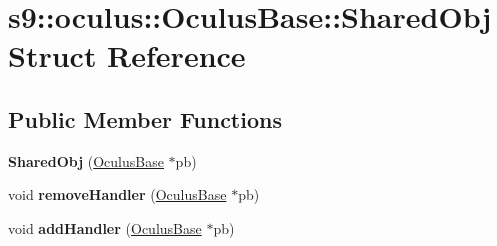 \hypertarget{structs9_1_1oculus_1_1OculusBase_1_1SharedObj}{\section{s9\-:\-:oculus\-:\-:\-Oculus\-Base\-:\-:\-Shared\-Obj \-Struct \-Reference}
\label{structs9_1_1oculus_1_1OculusBase_1_1SharedObj}
}
\subsection*{\-Public \-Member \-Functions}
\begin{DoxyCompactItemize}
\item 
\hypertarget{structs9_1_1oculus_1_1OculusBase_1_1SharedObj_a418315a53d540e4d108e287c7aeee968}{{\bfseries \-Shared\-Obj} (\hyperlink{classs9_1_1oculus_1_1OculusBase}{\-Oculus\-Base} $\ast$pb)}\label{structs9_1_1oculus_1_1OculusBase_1_1SharedObj_a418315a53d540e4d108e287c7aeee968}

\item 
\hypertarget{structs9_1_1oculus_1_1OculusBase_1_1SharedObj_a78657ecab21e06631fa1ede8ae62d153}{void {\bfseries remove\-Handler} (\hyperlink{classs9_1_1oculus_1_1OculusBase}{\-Oculus\-Base} $\ast$pb)}\label{structs9_1_1oculus_1_1OculusBase_1_1SharedObj_a78657ecab21e06631fa1ede8ae62d153}

\item 
\hypertarget{structs9_1_1oculus_1_1OculusBase_1_1SharedObj_a2703b4fef1313e479483857f0b5e0a00}{void {\bfseries add\-Handler} (\hyperlink{classs9_1_1oculus_1_1OculusBase}{\-Oculus\-Base} $\ast$pb)}\label{structs9_1_1oculus_1_1OculusBase_1_1SharedObj_a2703b4fef1313e479483857f0b5e0a00}

\end{DoxyCompactItemize}
